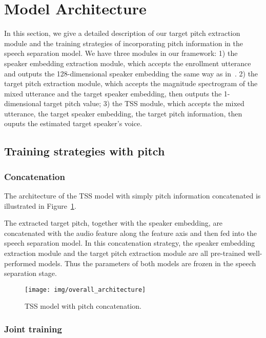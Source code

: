 

\section{Model Architecture}
\label{sec:architecture}

In this section, we give a detailed description of our target pitch extraction module and the training strategies of incorporating pitch information in the speech separation model.
We have three modules in our framework: 1) the speaker embedding extraction module, which accepts the enrollment utterance and outputs the 128-dimensional speaker embedding the same way as in~\cite{li20p_interspeech}. 2) the target pitch extraction module, which accepts the magnitude spectrogram of the mixed utterance and the target speaker embedding, then outputs the 1-dimensional target pitch value; 3) the TSS module, which accepts the mixed utterance, the target speaker embedding, the target pitch information, then ouputs the estimated target speaker's voice.

\subsection{Training strategies with pitch}
\label{subsec:two_training_strategy}

\subsubsection{Concatenation}
\label{subsubsec:pitch_cat}
The architecture of the TSS model with simply pitch information concatenated is illustrated in Figure~\ref{fig:pitch_concatenate}.

The extracted target pitch, together with the speaker embedding, are concatenated with the audio feature along the feature axis and then fed into the speech separation model. In this concatenation strategy, the speaker embedding extraction module and the target pitch extraction module are all pre-trained well-performed models. Thus the parameters of both models are frozen in the speech separation stage.

\begin{figure}[t]
    \centering
    \texttt{[image: img/overall\_architecture]}
    \caption{TSS model with pitch concatenation.}
    \label{fig:pitch_concatenate}
\end{figure}

\subsubsection{Joint training}
\label{subsubsec:pitch_joint}

